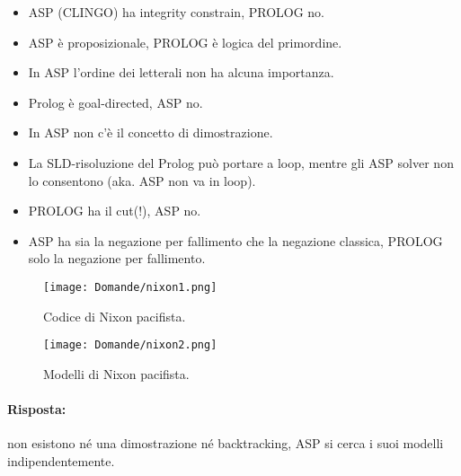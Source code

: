 \begin{itemize}
  \item ASP (CLINGO) ha integrity constrain, PROLOG no.
  \item ASP è proposizionale, PROLOG è logica del primordine. 
\item In ASP l’ordine dei letterali non ha alcuna importanza. 
  \item Prolog è goal-directed, ASP no.
  \item In ASP non c'è il concetto di dimostrazione.
  \item La SLD-risoluzione del Prolog può portare a loop,
mentre gli ASP solver non lo consentono (aka. ASP non va in loop). 
\item PROLOG ha il cut(!), ASP no.
\item ASP ha sia la negazione per fallimento che la negazione classica, PROLOG solo la negazione per fallimento.
\end{itemize}


\begin{figure}[h]
    \centering
    \begin{minipage}{0.45\textwidth}
        \centering
        \texttt{[image: Domande/nixon1.png]}
        \caption{Codice di Nixon pacifista.}
    \end{minipage}
    \hfill
    \begin{minipage}{0.45\textwidth}
        \centering
        \texttt{[image: Domande/nixon2.png]}
        \caption{Modelli di Nixon pacifista.}
    \end{minipage}
\end{figure}




\paragraph{Risposta:} non esistono né una dimostrazione né backtracking, ASP si cerca i suoi modelli indipendentemente.





